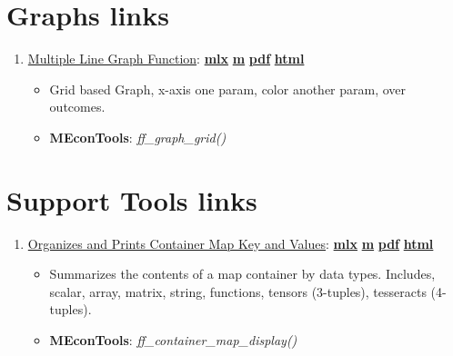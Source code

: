 \documentclass[
]{book}
\providecommand{\tightlist}{%
  \setlength{\itemsep}{0pt}\setlength{\parskip}{0pt}}
\begin{document}
\hypertarget{graphs-links}{%
\section{Graphs links}\label{graphs-links}}

\begin{enumerate}
\def\labelenumi{\arabic{enumi}.}
\tightlist
\item
  \href{https://fanwangecon.github.io/MEconTools/MEconTools/doc/graph/htmlpdfm/fx_graph_grid.html}{Multiple Line Graph Function}: \href{https://github.com/FanWangEcon/MEconTools/blob/master/MEconTools/doc/graph/fx_graph_grid.mlx}{\textbf{mlx}} \textbar{} \href{https://github.com/FanWangEcon/MEconTools/blob/master/MEconTools/doc/graph/htmlpdfm/fx_graph_grid.m}{\textbf{m}} \textbar{} \href{https://github.com/FanWangEcon/MEconTools/blob/master/MEconTools/doc/graph/htmlpdfm/fx_graph_grid.pdf}{\textbf{pdf}} \textbar{} \href{https://fanwangecon.github.io/MEconTools/MEconTools/doc/graph/htmlpdfm/fx_graph_grid.html}{\textbf{html}}

  \begin{itemize}
  \tightlist
  \item
    Grid based Graph, x-axis one param, color another param, over outcomes.
  \item
    \textbf{MEconTools}: \emph{ff\_graph\_grid()}
  \end{itemize}
\end{enumerate}

\hypertarget{support-tools-links}{%
\section{Support Tools links}\label{support-tools-links}}

\begin{enumerate}
\def\labelenumi{\arabic{enumi}.}
\tightlist
\item
  \href{https://fanwangecon.github.io/MEconTools/MEconTools/doc/tools/htmlpdfm/fx_container_map_display.html}{Organizes and Prints Container Map Key and Values}: \href{https://github.com/FanWangEcon/MEconTools/blob/master/MEconTools/doc/tools/fx_container_map_display.mlx}{\textbf{mlx}} \textbar{} \href{https://github.com/FanWangEcon/MEconTools/blob/master/MEconTools/doc/tools/htmlpdfm/fx_container_map_display.m}{\textbf{m}} \textbar{} \href{https://github.com/FanWangEcon/MEconTools/blob/master/MEconTools/doc/tools/htmlpdfm/fx_container_map_display.pdf}{\textbf{pdf}} \textbar{} \href{https://fanwangecon.github.io/MEconTools/MEconTools/doc/tools/htmlpdfm/fx_container_map_display.html}{\textbf{html}}

  \begin{itemize}
  \tightlist
  \item
    Summarizes the contents of a map container by data types. Includes, scalar, array, matrix, string, functions, tensors (3-tuples), tesseracts (4-tuples).
  \item
    \textbf{MEconTools}: \emph{ff\_container\_map\_display()}
  \end{itemize}
\end{enumerate}

  
\end{document}
